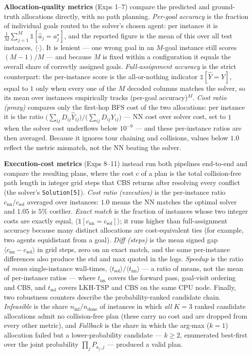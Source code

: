 \documentclass[11pt,a4paper]{article}
\begin{document}
\medskip
\noindent\textbf{Allocation-quality metrics} (Exps 1--7) compare the predicted and ground-truth
allocations directly, with no path planning. \emph{Per-goal accuracy} is the fraction of
individual goals routed to the solver's chosen agent: per instance it is
$\frac{1}{M}\sum_{j=1}^{M}\mathbb{1}[\hat a_j=a^\star_j]$, and the reported figure is the mean of
this over all test instances, $\langle\cdot\rangle$. It is lenient --- one wrong goal in an
$M$-goal instance still scores $(M{-}1)/M$ --- and because $M$ is fixed within a configuration it
equals the overall share of correctly assigned goals. \emph{Full-assignment accuracy} is the
strict counterpart: the per-instance score is the all-or-nothing indicator
$\mathbb{1}[\hat Y = Y]$, equal to $1$ only when every one of the $M$ decoded columns matches the
solver, so its mean over instances empirically tracks (per-goal accuracy)$^{M}$. \emph{Cost ratio
(proxy)} compares only the first-hop BFS cost of the two allocations: per instance it is the ratio
$\big(\sum_{ij} D_{ij}\hat Y_{ij}\big)\big/\big(\sum_{ij} D_{ij} Y_{ij}\big)$ --- NN cost over
solver cost, set to $1$ when the solver cost underflows below $10^{-9}$ --- and these per-instance
ratios are then averaged. Because it ignores tour chaining and collisions, values below $1.0$
reflect the metric mismatch, not the NN beating the solver.

\medskip
\noindent\textbf{Execution-cost metrics} (Exps 8--11) instead run both pipelines end-to-end and
compare the resulting plans, where the cost $c$ of a plan is the total collision-free path length
in integer grid steps that CBS returns after resolving every conflict (the solver's
\texttt{Solution[5]}). \emph{Cost ratio (execution)} is the per-instance ratio
$c_{\mathrm{nn}}/c_{\mathrm{sol}}$ averaged over instances: $1.0$ means the NN matches the optimal
solver and $1.05$ is $5\%$ costlier. \emph{Exact match} is the fraction of instances whose two
integer costs are exactly equal, $\langle\mathbb{1}[c_{\mathrm{nn}}=c_{\mathrm{sol}}]\rangle$; it
runs higher than full-assignment accuracy because many distinct allocations are cost-equivalent
ties (for example, two agents equidistant from a goal). \emph{Diff (steps)} is the mean signed gap
$\langle c_{\mathrm{nn}}-c_{\mathrm{sol}}\rangle$ in grid steps, zero on an exact match, and the
same per-instance differences also produce the std and max quoted in the logs. \emph{Speedup} is
the ratio of \emph{mean} single-instance wall-times,
$\langle t_{\mathrm{sol}}\rangle/\langle t_{\mathrm{nn}}\rangle$ --- a ratio of means, not the mean
of per-instance ratios --- where $t_{\mathrm{nn}}$ covers the forward pass, goal-visit ordering and
CBS, and $t_{\mathrm{sol}}$ covers LKH-TSP and CBS on the same CPU node. Finally, two robustness
counters describe the probability-ranked candidate chain. \emph{Infeasible} is the share
$n_{\mathrm{inf}}/n_{\mathrm{done}}$ of instances in which \emph{all} $K{=}3$ ranked candidate
allocations admit no collision-free plan (these carry no cost and are dropped from every other
metric), and \emph{Fallback} is the share in which the arg-max ($k{=}1$) allocation failed but a
lower-probability candidate --- $k\ge2$, enumerated best-first over the joint probability
$\prod_j P_{a_j,j}$ --- produced a valid plan.
\end{document}
